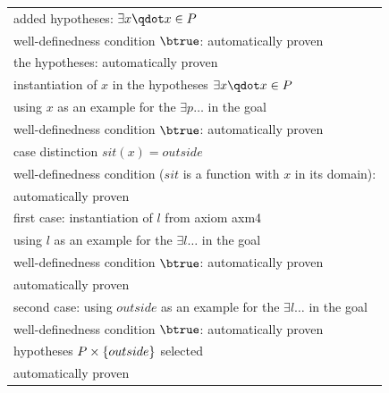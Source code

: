 \begin{tabular}{l}
  \hline
  added hypotheses: $\exists x\qdot x\in P$ \\
  \quad well-definedness condition $\btrue$: automatically proven\\
  \quad the hypotheses: automatically proven \\
  \quad instantiation of $x$ in the hypotheses $\exists x\qdot x\in P$\\
  \qquad using $x$ as an example for the $\exists p \ldots$ in the goal\\
  \quad\qquad well-definedness condition $\btrue$: automatically proven\\
  \quad\qquad case distinction $sit(x)=outside$ \\
  \qquad\qquad well-definedness condition
    ($sit$ is a function with $x$ in its domain): \\
  \qquad\qquad\qquad\qquad\qquad\qquad automatically proven\\
  \qquad\qquad first case: instantiation of $l$ from axiom \textsf{axm4}\\
  \quad\qquad\qquad using $l$ as an example for the $\exists l \ldots$ in the goal\\
  \qquad\qquad\qquad well-definedness condition $\btrue$: automatically proven\\
  \qquad\qquad\qquad automatically proven\\
  \qquad\qquad second case: using $outside$ as an example for the $\exists l \ldots$ in the goal\\
  \quad\qquad\qquad well-definedness condition $\btrue$: automatically proven\\
  \quad\qquad\qquad hypotheses $P\mathbin\times\{outside\}$ selected\\
  \qquad\qquad\qquad automatically proven\\
  \hline
\end{tabular}
